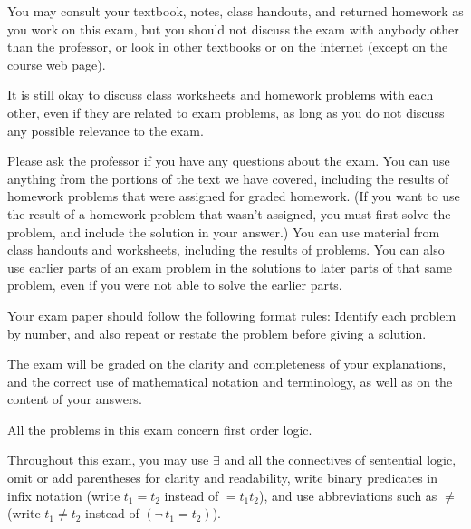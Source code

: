 



\bigskip
You may consult your textbook, notes, class handouts, and returned
homework as you work on this exam, but you should not discuss the exam
with anybody other than the professor, or look in other textbooks or on the
internet (except on the course web page).

It is still okay to discuss class worksheets and homework problems with
each other, even if they are related to exam problems, as long as you do not
discuss any possible relevance to the exam.

Please ask the professor if you have any questions about the exam.
You can use anything from the portions of the text we have covered,
including the results of homework problems that were assigned for graded
homework. (If you want to use the result of a homework problem that wasn't
assigned, you must first solve the problem, and include the solution in your
answer.) You can use material from class handouts and worksheets, including
the results of problems. You can also use earlier parts of an exam problem in
the solutions to later parts of that same problem, even if you were not able
to solve the earlier parts.

Your exam paper should follow the following format rules: Identify each
problem by number, and also repeat or restate the problem before giving a
solution.

The exam will be graded on the clarity and completeness of your explanations,
and the correct use of mathematical notation and terminology, as
well as on the content of your answers.

\bigskip

All the problems in this exam concern first order logic.

Throughout this exam, you may use $\exists$ and all the connectives
of sentential logic, omit or add parentheses for clarity and readability,
write binary predicates in infix notation (write $t_1 = t_2$ instead of
$= t_1t_2$), and use abbreviations such as $\neq$ (write $t_1 \neq t_2$
instead of $(\neg \, t_1=t_2)$).
